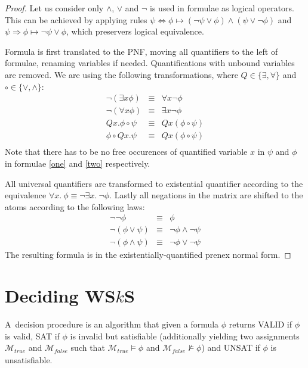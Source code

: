 	\begin{proof}
Let us consider only $\wedge$, $\vee$ and $\neg$ is used in formulae as logical
operators. This can be achieved by applying rules $\psi \Leftrightarrow \phi
\mapsto (\neg \psi \vee \phi) \wedge (\psi \vee \neg \phi)$ and $\psi
\Rightarrow \phi \mapsto \neg \psi \vee \phi$, which preservers logical
equivalence.
	
Formula is first translated to the PNF, moving all quantifiers to the left
of formulae, renaming variables if needed. Quantifications with unbound
variables are removed. We are using the following transformations, where $Q \in
\{\exists, \forall\}$ and $\circ \in \{\vee, \wedge\}$:
	\begin{eqnarray}
	 \neg(\exists x \phi) & \equiv & \forall x\neg \phi\\
	 \neg(\forall x \phi) & \equiv & \exists x\neg \phi\\
	 Qx.\phi \circ \psi & \equiv & Qx(\phi \circ \psi)\label{one}\\
	 \phi \circ Qx.\psi & \equiv & Qx(\phi \circ \psi)\label{two}\\
	\end{eqnarray}
Note that there has to be no free occurences of quantified variable $x$ in
$\psi$ and $\phi$ in formulae \ref{one} and \ref{two} respectively.
	
All universal quantifiers are transformed to existential quantifier
according to the equivalence $\forall x.\ \phi \equiv \neg\exists x.\ \neg\phi$.
Lastly all negations in the matrix are shifted to the atoms according to the
following laws:
	\begin{eqnarray}
	 \neg\neg\phi & \equiv & \phi\\
	 \neg(\phi\vee \psi) & \equiv & \neg \phi \wedge \neg \psi\\
	 \neg(\phi\wedge \psi) & \equiv & \neg \phi \vee \neg \psi 
	\end{eqnarray}
 The resulting formula is in the existentially-quantified prenex normal form. 
	\end{proof}
	
\section{Deciding WS$k$S}\label{classical}

A~decision procedure is an algorithm that given a formula $\phi$ returns VALID
if $\phi$ is valid, SAT if $\phi$ is invalid but satisfiable (additionally
yielding two assignments $\mathcal{M}_{true}$ and $\mathcal{M}_{false}$ such
that $\mathcal{M}_{\mathit{true}} \models \phi$ and
$\mathcal{M}_{\mathit{false}} \not\models \phi$) and UNSAT if $\phi$ is unsatisfiable.

